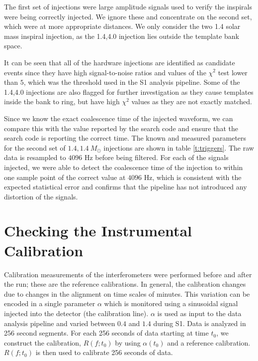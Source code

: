 The first set of injections were large amplitude signals used to verify the
inspirals were being correctly injected. We ignore these and concentrate on
the second set, which were at more appropriate distances.  We only consider
the two 1.4 solar mass inspiral injection, as the 1.4,4.0 injection lies
outside the template bank space.

It can be seen that all of the hardware injections are identified as candidate
events since they have high signal-to-noise ratios and values of the $\chi^2$
test lower than $5$, which was the threshold used in the S1 analysis
pipeline\cite{LIGOS1iul}. Some of the 1.4,4.0 injections are also flagged
for further investigation as they cause templates inside the bank to ring, but
have high $\chi^2$ values as they are not exactly matched.

Since we know the exact coalescence time of the injected waveform, we can
compare this with the value reported by the search code and ensure that the
search code is reporting the correct time.  The known and measured parameters
for the second set of $1.4,1.4\ M_\odot$ injections are shown in table
\ref{t:triggers}. The raw data is resampled to $4096$ Hz before being
filtered. For each of the signals injected, we were able to detect the
coalescence time of the injection to within one sample point of the correct
value at $4096$ Hz, which is consistent with the expected statistical error
and confirms that the pipeline has not introduced any distortion of the
signals.


\section{Checking the Instrumental Calibration}
\label{s:calibration}

Calibration measurements of the interferometers were performed before and
after the run; these are the reference calibrations. In general, the
calibration changes due to changes in the alignment on time scales of minutes.
This variation can be encoded in a single parameter $\alpha$ which is
monitored using a sinusoidal signal injected into the
detector (the calibration line)\cite{Adhikari:2003}. $\alpha$ is used as input
to the data analysis pipeline and varied between $0.4$ and $1.4$ during S1.
Data is analyzed in 256 second segments.  For each 256 seconds of data
starting at time $t_0$, we construct the calibration, $R(f;t_0)$ by using
$\alpha(t_0)$ and a reference calibration.  $R(f;t_0)$ is then used to
calibrate 256 seconds of data.

